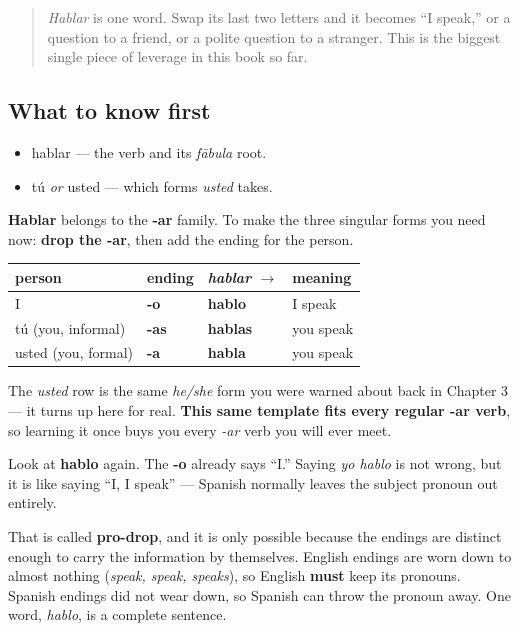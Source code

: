 \label{lesson:ES-C06-ar-presente}



\begin{quote}
\emph{Hablar} is one word. Swap its last two letters and it becomes \textquotedblleft{}I speak,\textquotedblright{} or a question to a friend, or a polite question to a stranger. This is the biggest single piece of leverage in this book so far.
\end{quote}

\subsection*{What to know first}
\begin{itemize}
\raggedright
  \item hablar — the verb and its \emph{fābula} root.
  \item tú \emph{or} usted — which forms \emph{usted} takes.
\end{itemize}

\begin{grammarlens}[title={Grammar Lens: the -ar present tense}]
\textbf{Hablar} belongs to the \textbf{-ar} family. To make the three singular forms you need now: \textbf{drop the -ar}, then add the ending for the person.

\noindent
\begin{tabularx}{\linewidth}{@{}>{\raggedright\arraybackslash}X>{\raggedright\arraybackslash}X>{\raggedright\arraybackslash}X>{\raggedright\arraybackslash}X@{}}
\toprule
\textbf{person} & \textbf{ending} & \textbf{\emph{hablar} $\to$} & \textbf{meaning} \\
\midrule
I & \textbf{-o} & \textbf{hablo} & I speak \\
tú (you, informal) & \textbf{-as} & \textbf{hablas} & you speak \\
usted (you, formal) & \textbf{-a} & \textbf{habla} & you speak \\
\bottomrule
\end{tabularx}

The \emph{usted} row is the same \emph{he/she} form you were warned about back in Chapter 3 — it turns up here for real. \textbf{This same template fits every regular -ar verb}, so learning it once buys you every \emph{-ar} verb you will ever meet.
\end{grammarlens}

\begin{grammarlens}[title={Grammar Lens: pro-drop}]
Look at \textbf{hablo} again. The \textbf{-o} already says \textquotedblleft{}I.\textquotedblright{} Saying \emph{yo hablo} is not wrong, but it is like saying \textquotedblleft{}I, I speak\textquotedblright{} — Spanish normally leaves the subject pronoun out entirely.

That is called \textbf{pro-drop}, and it is only possible because the endings are distinct enough to carry the information by themselves. English endings are worn down to almost nothing (\emph{speak, speak, speaks}), so English \textbf{must} keep its pronouns. Spanish endings did not wear down, so Spanish can throw the pronoun away. One word, \emph{hablo}, is a complete sentence.
\end{grammarlens}

